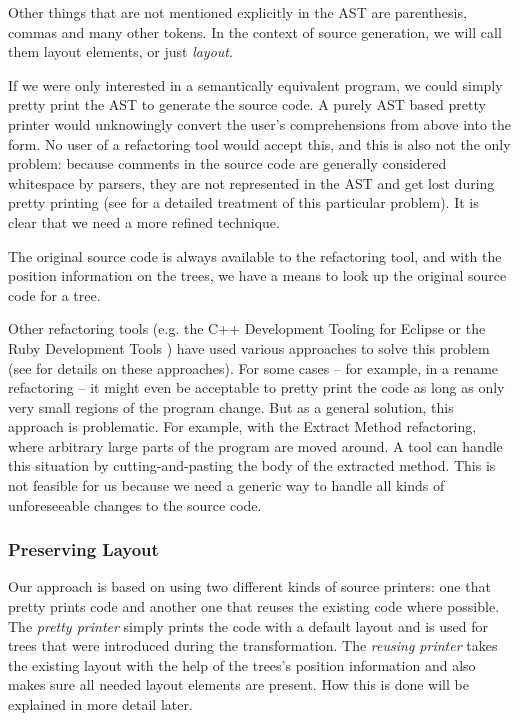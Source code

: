 Other things that are not mentioned explicitly in the AST are parenthesis, commas and many other tokens. In the context of source generation, we will call them layout elements, or just \textit{layout}. 

If we were only interested in a semantically equivalent program, we could simply pretty print the AST to generate the source code. A purely AST based pretty printer would unknowingly convert the user's  comprehensions from above into the  form. No user of a refactoring tool would accept this, and this is also not the only problem: because comments in the source code are generally considered whitespace by parsers, they are not represented in the AST and get lost during pretty printing (see \cite{RetainingComments} for a detailed treatment of this particular problem). It is clear that we need a more refined technique.

The original source code is always available to the refactoring tool, and with the position information on the trees, we have a means to look up the original source code for a tree.

Other refactoring tools (e.g. the C++ Development Tooling for Eclipse \cite{CdtOopsla} or the Ruby Development Tools \cite{RubyOopsla}) have used various approaches to solve this problem (see \cite{ScalaRefactoring} for details on these approaches). For some cases -- for example, in a rename refactoring -- it might even be acceptable to pretty print the code as long as only very small regions of the program change. But as a general solution, this approach is problematic. For example, with the Extract Method refactoring, where arbitrary large parts of the program are moved around. A tool can handle this situation by cutting-and-pasting the body of the extracted method. This is not feasible for us because we need a generic way to handle all kinds of unforeseeable changes to the source code.

\subsubsection{Preserving Layout}

Our approach is based on using two different kinds of source printers: one that pretty prints code  and another one that reuses the existing code where possible. The \textit{pretty printer} simply prints the code with a default layout and is used for trees that were introduced during the transformation. The \textit{reusing printer} takes the existing layout with the help of the trees's position information and also makes sure all needed layout elements are present. How this is done will be explained in more detail later.

